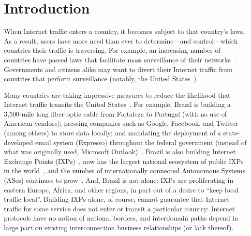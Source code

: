 \section{Introduction}
\label{intro}

When Internet traffic enters a country, it becomes subject to that
country's laws.  As a result, users have more need than ever to
determine---and control---which countries their traffic is traversing.
For example, an increasing number of countries have passed laws that
facilitate mass surveillance of their
networks~\cite{france_surveillance, netherlands_surveillance,
  kazak_surveillance, uk_bill}. Governments and citizens alike may want
to divert their Internet traffic from countries that perform
surveillance (notably, the United States~\cite{russia_secure_internet,
  routing_errors, dte}).

Many countries are taking impressive measures to reduce the likelihood
that Internet traffic transits the United States~\cite{brazil_history,
  brazil_break_from_US, brazil_conference, brazil_conference2,
  brazil_human_rights}.  For example, Brazil is building a 3,500-mile
long fiber-optic cable from Fortaleza to Portugal (with no use of
American vendors); pressing companies such as Google, Facebook, and
Twitter (among others) to store data locally; and mandating the
deployment of a state-developed email system (Expresso) throughout the
federal government (instead of what was originally used, Microsoft
Outlook)~\cite{brazil_cable, brazil_us_companies}.  Brazil is also
building Internet Exchange Points (IXPs)~\cite{brazil_IXP1}, now has the
largest national ecosystem of public IXPs in the
world~\cite{brazil_ixp_ecosystem}, and the number of internationally
connected Autonomous Systems (ASes) continues to
grow~\cite{brazil_international_ases}. And, Brazil is not alone: IXPs
are proliferating in eastern Europe, Africa, and other regions, in part
out of a desire to ``keep local traffic local''. Building IXPs alone, of
course, cannot guarantee that Internet traffic for some service does not
enter or transit a particular country: Internet protocols have no notion
of national borders, and interdomain paths depend in large part on
existing interconnection business relationships (or lack thereof).

